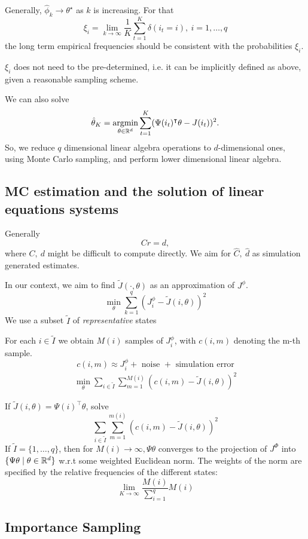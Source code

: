 Generally, \(\hat{\phi}_k\to\theta^\star\) as \(k\) is increasing. For that 
\[\xi_i=\lim_{k\to\infty} \frac{1}{K}\sum_{t=1}^K \delta(i_t=i),\ i=1,\dots,q\]
the long term empirical frequencies should be consistent with the probabilities \(\xi_i\).

\(\xi_i\) does not need to tbe pre-determined, i.e. it can 
be implicitly defined as above, given a reasonable sampling scheme.

We can also solve \[\hat{\theta}_K=\operatorname*{\text{argmin}}_{\theta\in\mathbb{R}^d}\sum_{t=1}^K (\Psi(i_t)^\intercal \theta-J(i_t))^2.\]
So, we reduce \(q\) dimensional linear algebra operations to \(d\)-dimensional ones, using Monte Carlo sampling, 
and perform lower dimensional linear algebra.

\subsection{MC estimation and the solution of linear equations systems}

Generally \[Cr=d,\]
where \(C,\ d\) might be difficult to compute directly. We aim for 
\(\hat{C},\ \hat{d}\) as simulation generated estimates.

In our context, we aim to find \(\tilde{J}(\cdot,\theta)\) as an approximation 
of \(J^\phi\).
\[\min_\theta\sum_{k=1}^q\left(J_i^\phi-\tilde{J}(i,\theta)\right)^2\]
We use a subset \(\tilde{I}\) of \textit{representative} states 

For each \(i\in \tilde{I}\) we obtain \(M(i)\) samples of \(J_i^\phi\), with \(c(i,m)\)
denoting the m-th sample.
\[c(i,m)\approx J_i^\phi+\text{ noise }+\text{ simulation error}\]
\begin{align*}
    \min_{\theta}\sum_{i\in\tilde{I}}\sum_{m=1}^{M(i)}\left(c(i,m)-\tilde{J}(i,\theta)\right)^2
\end{align*}

If \(\tilde{J}(i,\theta)=\Psi(i)^\intercal\theta\), solve 
\[\sum_{i\in \tilde{I}}\sum_{m=1}^{m(i)}(c(i,m)-\tilde{J}(i,\theta))^2\]
If \(\tilde{I}=\{1,\dots,q\}\), then for \(M(i)\to\infty,\Psi\theta\) converges 
to the projection of \(J^\Phi\) into \(\{\Psi\theta\mid\theta\in\mathbb{R}^d\}\) w.r.t 
some weighted Euclidean norm. The weights of the norm are specified by the relative 
frequencies of the different states:
\[\lim_{K\to\infty} \frac{M(i)}{\sum_{i=1}^q} M(i)\]

\subsection{Importance Sampling}

